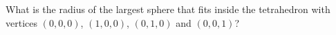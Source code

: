 What is the radius of the largest sphere that fits inside the tetrahedron with vertices $(0,0,0)$, $(1,0,0)$, $(0,1,0)$ and $(0,0,1)$?
